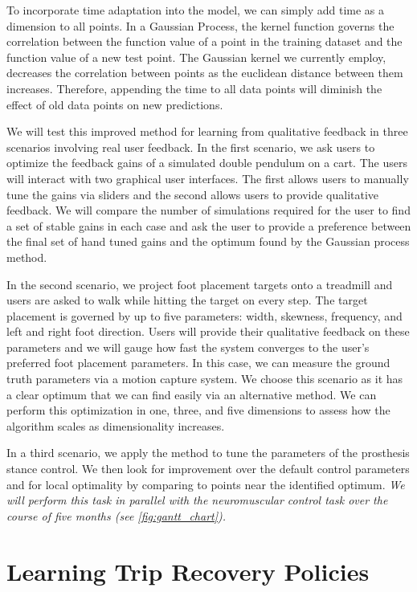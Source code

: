 To incorporate time adaptation into the model, we can simply add time as a
dimension to all points. In a Gaussian Process, the kernel function governs the
correlation between the function value of a point in the training dataset and
the function value of a new test point. The Gaussian kernel we currently employ,
decreases the correlation between points as the euclidean distance between them
increases. Therefore, appending the time to all data points will diminish the
effect of old data points on new predictions.

We will test this improved method for learning from qualitative feedback in
three scenarios involving real user feedback. In the first scenario, we ask
users to optimize the feedback gains of a simulated double pendulum on a cart.
The users will interact with two graphical user interfaces. The first allows
users to manually tune the gains via sliders and the second allows users to
provide qualitative feedback. We will compare the number of simulations required
for the user to find a set of stable gains in each case and ask the user to
provide a preference between the final set of hand tuned gains and the optimum
found by the Gaussian process method.

In the second scenario, we project foot placement targets onto a treadmill and
users are asked to walk while hitting the target on every step. The target
placement is governed by up to five parameters: width, skewness, frequency, and
left and right foot direction. Users will provide their qualitative feedback on
these parameters and we will gauge how fast the system converges to the user's
preferred foot placement parameters.  In this case, we can measure the ground
truth parameters via a motion capture system. We choose this scenario as it has
a clear optimum that we can find easily via an alternative method. We can
perform this optimization in one, three, and five dimensions to assess how the
algorithm scales as dimensionality increases. 

In a third scenario, we apply the method to tune the parameters of the
prosthesis stance control. We then look for improvement over the default control
parameters and for local optimality by comparing to points near the identified
optimum. \emph{We will perform this task in parallel with the neuromuscular
control task over the course of five months (see \cref{fig:gantt_chart}).}

\section{Learning Trip Recovery Policies}\label{sec:proposed_trip_class}

